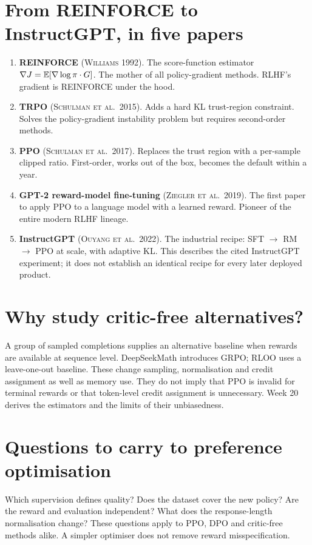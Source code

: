\documentclass[11pt,oneside]{scrbook}
\begin{document}
\section{From REINFORCE to InstructGPT, in five papers}

\begin{enumerate}[leftmargin=*]
  \item \textbf{REINFORCE} (\textsc{Williams 1992}). The score-function
    estimator $\nabla J = \mathbb{E}[\nabla\log\pi \cdot G]$. The mother of all
    policy-gradient methods. RLHF's gradient is REINFORCE under the hood.
  \item \textbf{TRPO} (\textsc{Schulman et al.\ 2015}). Adds a hard
    KL trust-region constraint. Solves the policy-gradient instability
    problem but requires second-order methods.
  \item \textbf{PPO} (\textsc{Schulman et al.\ 2017}). Replaces the
    trust region with a per-sample clipped ratio. First-order,
    works out of the box, becomes the default within a year.
  \item \textbf{GPT-2 reward-model fine-tuning} (\textsc{Ziegler et al.\ 2019}).
    The first paper to apply PPO to a language model with a learned
    reward. Pioneer of the entire modern RLHF lineage.
  \item \textbf{InstructGPT} (\textsc{Ouyang et al.\ 2022}). The
    industrial recipe: SFT $\to$ RM $\to$ PPO at scale, with adaptive
    KL. This describes the cited InstructGPT experiment; it does not establish an identical recipe for every later deployed product.
\end{enumerate}

\section{Why study critic-free alternatives?}
A group of sampled completions supplies an alternative baseline when rewards
are available at sequence level. DeepSeekMath introduces GRPO; RLOO uses a
leave-one-out baseline. These change sampling, normalisation and credit
assignment as well as memory use. They do not imply that PPO is invalid for
terminal rewards or that token-level credit assignment is unnecessary.
Week 20 derives the estimators and the limits of their unbiasedness.

\section{Questions to carry to preference optimisation}
Which supervision defines quality? Does the dataset cover the new policy?
Are the reward and evaluation independent? What does the response-length
normalisation change? These questions apply to PPO, DPO and critic-free
methods alike. A simpler optimiser does not remove reward misspecification.
\end{document}
